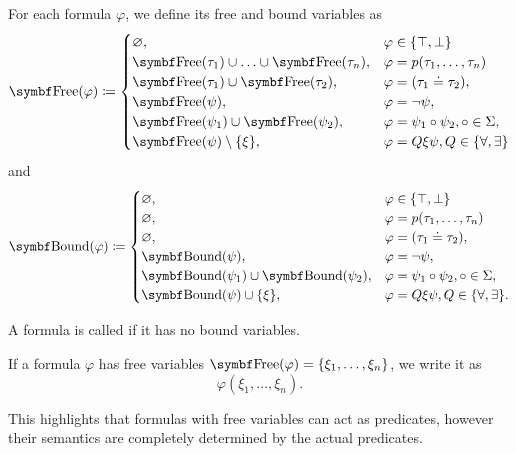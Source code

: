 \begin{definition}
  For each formula \( \varphi \), we define its free and bound variables as
  \begin{align*}
    \Cat{Free}(\varphi) \coloneqq \begin{cases}
      \varnothing,                                             &\varphi \in \{ \top, \bot \} \\
      \Cat{Free}(\tau_1) \cup \ldots \cup \Bold{Free}(\tau_n), &\varphi = p(\tau_1, \ldots, \tau_n) \\
      \Cat{Free}(\tau_1) \cup \Bold{Free}(\tau_2),             &\varphi = (\tau_1 \doteq \tau_2), \\
      \Cat{Free}(\psi),                                        &\varphi = \neg \psi, \\
      \Cat{Free}(\psi_1) \cup \Bold{Free}(\psi_2),             &\varphi = \psi_1 \circ \psi_2, \circ \in \Sigma, \\
      \Cat{Free}(\psi) \setminus \{ \xi \},                    &\varphi = Q \xi \psi, Q \in \{ \forall, \exists \}
    \end{cases}
  \end{align*}
  and
  \begin{align*}
    \Cat{Bound}(\varphi) \coloneqq \begin{cases}
      \varnothing,                                             &\varphi \in \{ \top, \bot \} \\
      \varnothing,                                             &\varphi = p(\tau_1, \ldots, \tau_n) \\
      \varnothing,                                             &\varphi = (\tau_1 \doteq \tau_2), \\
      \Cat{Bound}(\psi),                                       &\varphi = \neg \psi, \\
      \Cat{Bound}(\psi_1) \cup \Bold{Bound}(\psi_2),           &\varphi = \psi_1 \circ \psi_2, \circ \in \Sigma, \\
      \Cat{Bound}(\psi) \cup \{ \xi \},                        &\varphi = Q \xi \psi, Q \in \{ \forall, \exists \}.
    \end{cases}
  \end{align*}

  A formula is called  if it has no bound variables.

  If a formula \( \varphi \) has free variables \( \Cat{Free}(\varphi) = \{ \xi_1, \ldots, \xi_n \} \), we write it as
  \begin{equation*}
    \varphi(\xi_1, \ldots, \xi_n).
  \end{equation*}

  This highlights that formulas with free variables can act as predicates, however their semantics are completely determined by the actual predicates.
\end{definition}

